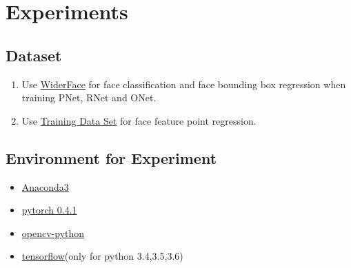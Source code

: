 \documentclass[journal, a4paper]{IEEEtran}
\begin{document}
\section{Experiments}
\subsection{Dataset}
\begin{enumerate}
	\item Use \href{http://mmlab.ie.cuhk.edu.hk/projects/WIDERFace/}{WiderFace} for face classification and face bounding box regression when training PNet, RNet and ONet. 
	\item Use \href{http://mmlab.ie.cuhk.edu.hk/archive/CNN_FacePoint.htm}{Training Data Set} for face feature point regression. 
\end{enumerate}

\subsection{Environment for Experiment} 
\begin{itemize}
	\item \href{https://www.anaconda.com/download/}{Anaconda3}
	\item \href{https://pytorch.org/}{pytorch 0.4.1}
	\item \href{https://pypi.org/project/opencv-python/}{opencv-python}
	\item \href{https://tensorflow.google.cn/install/pip}{tensorflow}(only for python 3.4,3.5,3.6)
\end{itemize}
\end{document}
